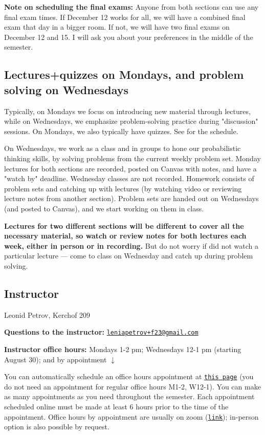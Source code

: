 \documentclass[oneside,11pt]{amsart}
\begin{document}
\medskip

\textbf{Note on scheduling the final exams:} Anyone from both sections can use any final exam times. If December 12 works for all, we will have a combined final exam that day in a bigger room. If not, we will have two final exams on December 12 and 15. I will ask you about your preferences in the middle of the semester.


\subsection{Lectures+quizzes on Mondays, and problem solving on Wednesdays}
Typically, on Mondays we focus on introducing new material through lectures, while on Wednesdays, we emphasize problem-solving practice during "discussion" sessions. On Mondays, we also typically have quizzes. See  for the schedule.

On Wednesdays, we work as a class and in groups to hone our probabilistic thinking skills, by solving problems from the current weekly problem set. Monday lectures for both sections are recorded, posted on Canvas with notes, and have a "watch by" deadline. Wednesday classes are not recorded. Homework consists of problem sets and catching up with lectures (by watching video or reviewing lecture notes from another section). Problem sets are handed out on Wednesdays (and posted to Canvas), and we start working on them in class.

\textbf{Lectures for two different sections will be different to cover all the necessary material, so watch or review notes for both lectures each week, either in person or in recording.} But do not worry if did not watch a particular lecture --- come to class on Wednesday and catch up during problem solving.



\subsection{Instructor}

Leonid Petrov, Kerchof 209

\textbf{Questions to the instructor:} \href{mailto:leniapetrov+f23@gmail.com}{\texttt{leniapetrov+f23@gmail.com}}

\textbf{Instructor office hours:} 
Mondays 1-2 pm; Wednesdays 12-1 pm (starting August 30); and by appointment $\downarrow$

You can automatically schedule an office hours appointment 
at \href{https://lpetrov.cc/teaching/}{\texttt{this page}} (you do not need an appointment for 
regular office hours M1-2, W12-1).
You can make as many appointments as you need throughout the semester.
Each appointment scheduled online
must be made at least 6 hours prior to the time of the appointment.
Office hours by appointment are usually on zoom (\href{https://virginia.zoom.us/j/97731277583?pwd=UFNvZ0NHNWRRaHpPTGYrTnJiZ3Rpdz09}{\texttt{link}}); 
in-person option is also possible by request.
\end{document}
